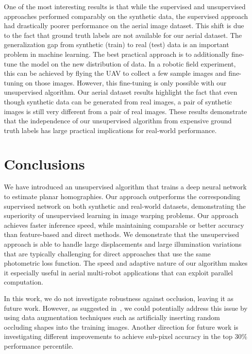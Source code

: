 \documentclass[letterpaper, 10 pt, conference]{ieeeconf}
\begin{document}
One of the most interesting results is that while the supervised and unsupervised approaches performed comparably on the synthetic data, the supervised approach had drastically poorer performance on the aerial image dataset. This shift is due to the fact that ground truth labels are not available for our aerial dataset. The generalization gap from synthetic (train) to real (test) data is an important problem in machine learning. The best practical approach is to additionally fine-tune the model on the new distribution of data. In a robotic field experiment, this can be achieved by flying the UAV to collect a few sample images and fine-tuning on those images. However, this fine-tuning is only possible with our unsupervised algorithm. Our aerial dataset results highlight the fact that even though synthetic data can be generated from real images, a pair of synthetic images is still very different from a pair of real images. These results demonstrate that the independence of our unsupervised algorithm from expensive ground truth labels has large practical implications for real-world performance.




 \section{Conclusions}
We have introduced an unsupervised algorithm that trains a deep neural network to estimate planar homographies. Our approach outperforms the corresponding supervised network on both synthetic and real-world datasets, demonstrating the superiority of unsupervised learning in image warping problems. Our approach achieves faster inference speed, while maintaining comparable or better accuracy than feature-based and direct methods. We demonstrate that the unsupervised approach is able to handle large displacements and large illumination variations that are typically challenging for direct approaches that use the same photometric loss function. The speed and adaptive nature of our algorithm makes it especially useful in aerial multi-robot applications that can exploit parallel computation.

In this work, we do not investigate robustness against occlusion, leaving it as future work. However, as suggested in~\cite{detone2016}, we could potentially address this issue by using data augmentation techniques such as artificially inserting random occluding shapes into the training images. Another direction for future work is investigating different improvements to achieve sub-pixel accuracy in the top $30\%$ performance percentile. 
\end{document}
